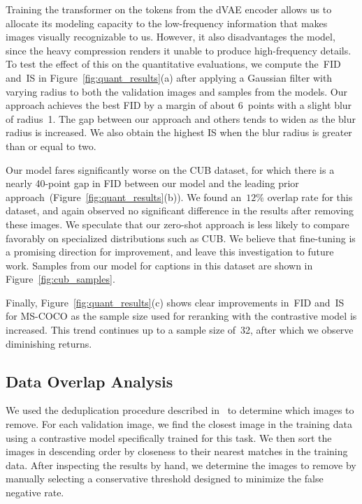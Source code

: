 Training the transformer on the tokens from the dVAE encoder allows us to allocate its modeling capacity to the low-frequency information that makes images visually recognizable to us. However, it also disadvantages the model, since the heavy compression renders it unable to produce high-frequency details. To test the effect of this on the quantitative evaluations, we compute the~FID and~IS in Figure~\ref{fig:quant_results}(a) after applying a Gaussian filter with varying radius to both the validation images and samples from the models. Our approach achieves the best FID by a margin of about 6~points with a slight blur of radius~1. The gap between our approach and others tends to widen as the blur radius is increased. We also obtain the highest IS when the blur radius is greater than or equal to two.

Our model fares significantly worse on the CUB dataset, for which there is a nearly 40-point gap in FID between our model and the leading prior approach~(Figure~\ref{fig:quant_results}(b)). We found an~$12\%$ overlap rate for this dataset, and again observed no significant difference in the results after removing these images. We speculate that our zero-shot approach is less likely to compare favorably on specialized distributions such as CUB. We believe that fine-tuning is a promising direction for improvement, and leave this investigation to future work. Samples from our model for captions in this dataset are shown in Figure~\ref{fig:cub_samples}.

Finally, Figure~\ref{fig:quant_results}(c) shows clear improvements in~FID and~IS for MS-COCO as the sample size used for reranking with the contrastive model is increased. This trend continues up to a sample size of~32, after which we observe diminishing returns.

\subsection{Data Overlap Analysis}
\label{sec:data_overlap_analysis}

We used the deduplication procedure described in~\citet{radford2021learning} to determine which images to remove. For each validation image, we find the closest image in the training data using a contrastive model specifically trained for this task. We then sort the images in descending order by closeness to their nearest matches in the training data. After inspecting the results by hand, we determine the images to remove by manually selecting a conservative threshold designed to minimize the false negative rate.


